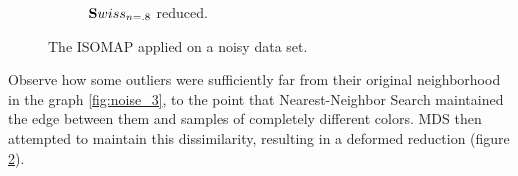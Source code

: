 \begin{description}
\begin{figure}[H]
\begin{subfigure}{.45\linewidth}
			\captionsetup{justification=centering}
			\caption{$\mathbf{S}wiss_{n=.8}$ reduced.}
			\label{fig:noise_2}
		\end{subfigure}
		\captionsetup{justification=centering}
		\caption{The ISOMAP applied on a noisy data set.}
	\end{figure}

	Observe how some outliers were sufficiently far from their original neighborhood in the graph \ref{fig:noise_3}, to the point that Nearest-Neighbor Search maintained the edge between them and samples of completely different colors. MDS then attempted to maintain this dissimilarity, resulting in a deformed reduction (figure \ref{fig:noise_2}).
\end{description}

